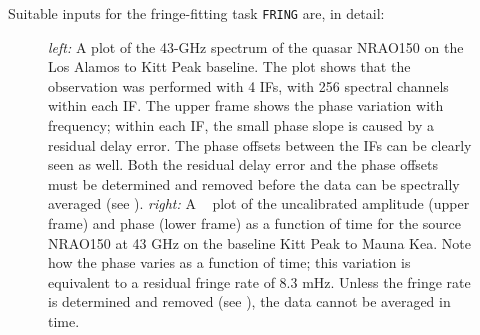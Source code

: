 Suitable inputs for the fringe-fitting task {\tt FRING} are, in
detail:

\begin{figure}[t]
\centering
\caption[{\tt POSSM} and {\tt VPLOT} displays of uncalibrated VLBI
data]{{\it left:\/} A {\tt {}} plot of the 43-GHz spectrum
of the quasar NRAO150 on the Los Alamos to Kitt Peak baseline. The
plot shows that the observation was performed with 4 IFs, with 256
spectral channels within each IF\@.  The upper frame shows the phase
variation with frequency; within each IF, the small phase slope is
caused by a residual delay error.  The phase offsets between the IFs
can be clearly seen as well.  Both the residual delay error and the
phase offsets must be determined and removed before the data can be
spectrally averaged (see ).  {\it right:\/} A {\tt
{}} plot of the uncalibrated amplitude (upper frame) and
phase (lower frame) as a function of time for the source NRAO150 at 43
GHz on the baseline Kitt Peak to Mauna Kea. Note how the phase varies
as a function of time; this variation is equivalent to a residual
fringe rate of 8.3 mHz.  Unless the fringe rate is determined and
removed (see ), the data cannot be averaged in time.}
\label{fig:VLBuncal}
\end{figure}
